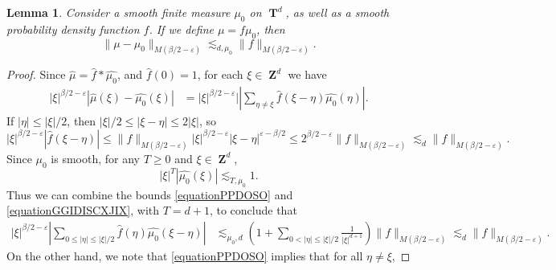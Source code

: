 \documentclass[12pt,reqno]{article}
\numberwithin{equation}{section}
\DeclareMathOperator{\ZZ}{\mathbf{Z}}
\DeclareMathOperator{\TT}{\mathbf{T}}
\newtheorem{lemma}{Lemma}
\begin{document}
\begin{lemma} \label{LemmaTTSICICS}
    Consider a smooth finite measure $\mu_0$ on $\TT^d$, as well as a smooth probability density function $f$. If we define $\mu = f \mu_0$, then
    \[ \| \mu - \mu_0 \|_{M(\beta/2 - \varepsilon)} \lesssim_{d,\mu_0} \| f \|_{M(\beta/2 - \varepsilon)}. \]
\end{lemma}
\begin{proof}
    Since $\widehat{\mu} = \widehat{f} * \widehat{\mu_0}$, and $\widehat{f}(0) = 1$, for each $\xi \in \ZZ^d$ we have
    \begin{equation} \label{equationPPYTUECUUCS}
    \begin{split}
        |\xi|^{\beta/2 - \varepsilon} |\widehat{\mu}(\xi) - \widehat{\mu_0}(\xi)| &= |\xi|^{\beta/2 - \varepsilon}| \left| \sum_{\eta \neq \xi} \widehat{f}(\xi - \eta) \widehat{\mu_0}(\eta) \right|.
    \end{split}
    \end{equation}
    If $|\eta| \leq |\xi|/2$, then $|\xi|/2 \leq |\xi - \eta| \leq 2 |\xi|$, so
    \begin{equation} \label{equationPPDOSO}
        |\xi|^{\beta/2 - \varepsilon} |\widehat{f}(\xi - \eta)| \leq \| f \|_{M(\beta/2 - \varepsilon)} |\xi|^{\beta/2 - \varepsilon} |\xi-\eta|^{\varepsilon-\beta/2} \leq 2^{\beta/2 - \varepsilon} \| f \|_{M(\beta/2 - \varepsilon)} \lesssim_d \| f \|_{M(\beta/2 - \varepsilon)}.
    \end{equation}
    Since $\mu_0$ is smooth, for any $T \geq 0$ and $\xi \in \ZZ^d$,
    \begin{equation} \label{equationGGIDISCXJIX}
        |\xi|^T |\widehat{\mu_0}(\xi)| \lesssim_{T,\mu_0} 1.
    \end{equation}
    Thus we can combine the bounds \eqref{equationPPDOSO} and \eqref{equationGGIDISCXJIX}, with $T = d+1$, to conclude that
    \begin{equation} \label{equationGGPSOVVCSI}
    \begin{split}
        |\xi|^{\beta/2 - \varepsilon} \left| \sum_{0 \leq |\eta| \leq |\xi|/2} \widehat{f}(\eta) \widehat{\mu_0}(\xi - \eta) \right| &\lesssim_{\mu_0,d} \left( 1 + \sum_{0 < |\eta| \leq |\xi|/2} \frac{1}{|\xi|^{d+1}} \right) \| f \|_{M(\beta/2 - \varepsilon)} \lesssim_d \| f \|_{M(\beta/2 - \varepsilon)}.
    \end{split}
    \end{equation}
    On the other hand, we note that \eqref{equationPPDOSO} implies that for all $\eta \neq \xi$,

\end{proof}
\end{document}
